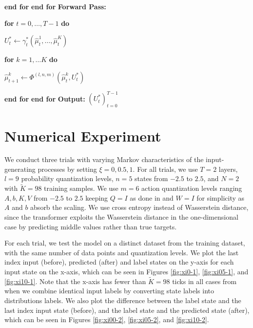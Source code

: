 \documentclass{article}
\begin{document}
\begin{algorithm}
\begin{algorithmic}[1]
\State \quad \textbf{end for}
\State \textbf{end for}
\State \textbf{Forward Pass:}

\State \textbf{for} $t = 0, \dots , T-1$ \textbf{do}

\State \quad $U^*_t \leftarrow \gamma ^*_t(\hat \mu _t ^1, \dots , \hat \mu _t ^K)$

\State \quad \textbf{for} $k = 1, \dots K$ \textbf{do}

\State \quad \quad $\hat \mu^k_{t+1} \leftarrow \Phi ^{(l, n, m)}(\hat \mu^k_t, U^*_t)$

\State \quad \textbf{end for}
\State \textbf{end for}
\State \textbf{Output:} $(U^*_t) ^{T -1}_{t = 0}$

\end{algorithmic}
\end{algorithm}

\newpage

\section{Numerical Experiment}

We conduct three trials with varying Markov characteristics of the input-generating processes by setting $\xi = 0, 0.5, 1$. For all trials, we use $T = 2$ layers, $l = 9$ probability quantization levels, $n = 5$ states from $-2.5$ to $2.5$, and $N = 2$ with $\tilde K = 98$ training samples. We use $m = 6$ action quantization levels ranging $A, b, K, V$ from $-2.5$ to $2.5$ keeping $Q = I$ as done in \cite{geshkovski2025mathematical} and $W = I$ for simplicity as $A$ and $b$ absorb the scaling. We use cross entropy instead of Wasserstein distance, since the transformer exploits the Wasserstein distance in the one-dimensional case by predicting middle values rather than true targets.

For each trial, we test the model on a distinct dataset from the training dataset, with the same number of data points and quantization levels. We plot the last index input (before), predicted (after) and label states on the y-axis for each input state on the x-axis, which can be seen in Figures \ref{fig:xi0-1}, \ref{fig:xi05-1}, and \ref{fig:xi10-1}. Note that the x-axis has fewer than $\tilde K = 98$ ticks in all cases from when we combine identical input labels by converting state labels into distributions labels. We also plot the difference between the label state and the last index input state (before), and the label state and the predicted state (after), which can be seen in Figures \ref{fig:xi00-2}, \ref{fig:xi05-2}, and \ref{fig:xi10-2}.
\end{document}
